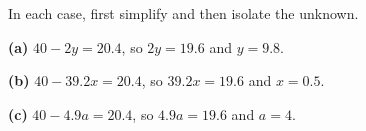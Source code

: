 In each case, first simplify and then isolate the unknown.

\textbf{(a)} $40-2y=20.4$, so $2y=19.6$ and $y=\boxed{9.8}$.

\textbf{(b)} $40-39.2x=20.4$, so $39.2x=19.6$ and $x=\boxed{0.5}$.

\textbf{(c)} $40-4.9a=20.4$, so $4.9a=19.6$ and $a=\boxed{4}$.
